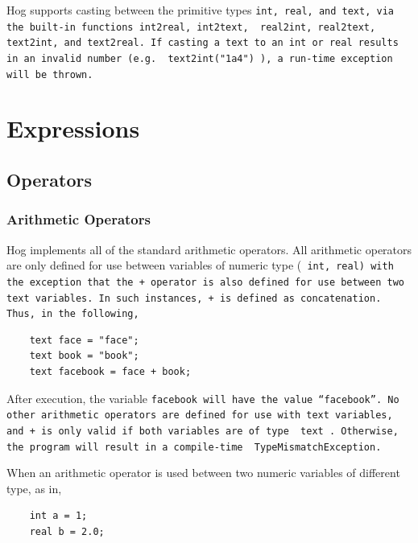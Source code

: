 \documentclass{report}
\begin{document}
Hog supports casting between the primitive types \tt int\rm, \tt real\rm, and
\tt text\rm, via the built-in functions \tt int2real\rm, \tt int2text\rm, \tt
real2int\rm, \tt real2text\rm, \tt text2int\rm, and \tt text2real\rm. If
casting a text to an int or real results in an invalid number (e.g. \tt
text2int("1a4") \rm), a run-time exception will be thrown.



\section{Expressions} %
\label{sec:expressions}

\subsection{Operators} %
\label{sub:operators}

\subsubsection{Arithmetic Operators} %
\label{ssub:arithmetic_operators}

Hog implements all of the standard arithmetic operators. All arithmetic
operators are only defined for use between variables of numeric type (\tt
int\rm, \tt real\rm) with the exception that the \tt + \rm operator is also
defined for use between two \tt text \rm variables. In such instances, \tt +
\rm is defined as concatenation. Thus, in the following,

\begin{verbatim}
    text face = "face";
    text book = "book";
    text facebook = face + book;
\end{verbatim}

After execution, the variable \tt facebook \rm will have the value
``facebook''. No other arithmetic operators are defined for use with \tt text
\rm variables, and \tt + \rm is only valid if both variables are of type \tt
text \rm. Otherwise, the program will result in a compile-time \tt
TypeMismatchException\rm. 

When an arithmetic operator is used between two numeric variables of different
type, as in,

\begin{verbatim}
    int a = 1;
    real b = 2.0;
\end{verbatim}
\end{document}
